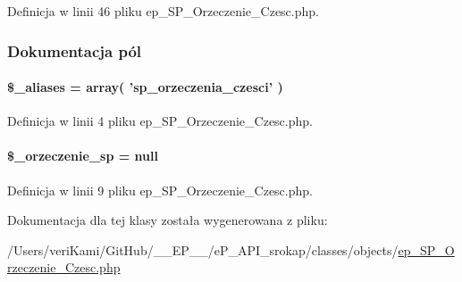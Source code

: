 Definicja w linii 46 pliku ep\-\_\-\-S\-P\-\_\-\-Orzeczenie\-\_\-\-Czesc.\-php.



\subsubsection{Dokumentacja pól}
\hypertarget{classep___s_p___orzeczenie___czesc_ab4e31d75f0bc5d512456911e5d01366b}{
\paragraph[{\$\-\_\-aliases}]{\setlength{\rightskip}{0pt plus 5cm}\$\-\_\-aliases = array( 'sp\-\_\-orzeczenia\-\_\-czesci' )}}\label{classep___s_p___orzeczenie___czesc_ab4e31d75f0bc5d512456911e5d01366b}


Definicja w linii 4 pliku ep\-\_\-\-S\-P\-\_\-\-Orzeczenie\-\_\-\-Czesc.\-php.

\hypertarget{classep___s_p___orzeczenie___czesc_aa2e1ecb50e6fae26a854ac995f7226b8}{
\paragraph[{\$\-\_\-orzeczenie\-\_\-sp}]{\setlength{\rightskip}{0pt plus 5cm}\$\-\_\-orzeczenie\-\_\-sp = null\hspace{0.3cm}{\ttfamily [protected]}}}\label{classep___s_p___orzeczenie___czesc_aa2e1ecb50e6fae26a854ac995f7226b8}


Definicja w linii 9 pliku ep\-\_\-\-S\-P\-\_\-\-Orzeczenie\-\_\-\-Czesc.\-php.



Dokumentacja dla tej klasy została wygenerowana z pliku\-:\begin{DoxyCompactItemize}
\item 
/\-Users/veri\-Kami/\-Git\-Hub/\-\_\-\-\_\-\-E\-P\-\_\-\-\_\-/e\-P\-\_\-\-A\-P\-I\-\_\-srokap/classes/objects/\hyperlink{ep___s_p___orzeczenie___czesc_8php}{ep\-\_\-\-S\-P\-\_\-\-Orzeczenie\-\_\-\-Czesc.\-php}\end{DoxyCompactItemize}
